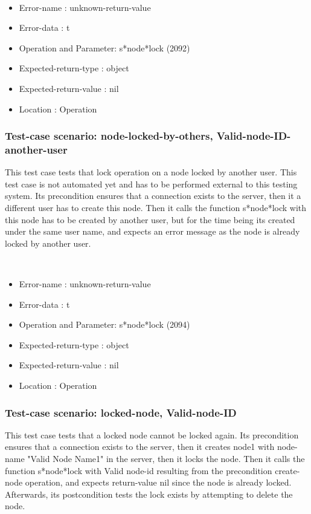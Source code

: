 \
\begin {itemize}
\item 	Error-name             : unknown-return-value
\item Error-data             : t
\item Operation and Parameter: s*node*lock (2092)
\item Expected-return-type   : object
\item Expected-return-value  : nil
\item Location               : Operation



\end {itemize}
\subsubsection {Test-case scenario: node-locked-by-others, Valid-node-ID-another-user}


This test case tests that lock operation on a node locked by another user.  This test case is not automated yet and has to be performed external to this testing system.
Its precondition ensures that a connection exists to the server, then it a different user has to create this node.
Then it calls the function s*node*lock  with this node has to be created by another user, but for the time being its created under the same user name, and expects an error message as the node is already locked by another user.



\
\begin {itemize}
\item 	Error-name             : unknown-return-value
\item Error-data             : t
\item Operation and Parameter: s*node*lock (2094)
\item Expected-return-type   : object
\item Expected-return-value  : nil
\item Location               : Operation



\end {itemize}
\subsubsection {Test-case scenario: locked-node, Valid-node-ID}


This test case tests that a locked node cannot be locked again.
Its precondition ensures that a connection exists to the server, then it creates node1 with node-name "Valid Node Name1" in the server, then it locks the node.
Then it calls the function s*node*lock  with Valid node-id resulting from the precondition create-node operation, and expects return-value nil since the node is already locked.
Afterwards, its postcondition tests the lock exists by attempting to delete the node.




